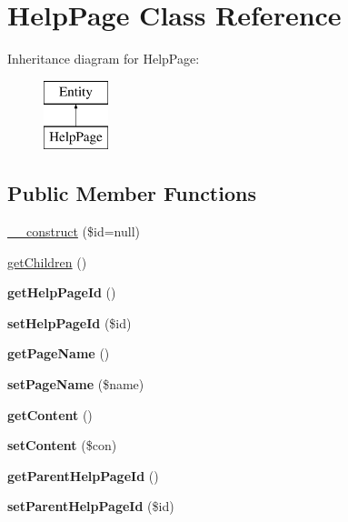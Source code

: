 \hypertarget{classHelpPage}{
\section{HelpPage Class Reference}
\label{classHelpPage}
}
Inheritance diagram for HelpPage:\begin{figure}[H]
\begin{center}
\leavevmode
\includegraphics[height=2.000000cm]{classHelpPage}
\end{center}
\end{figure}
\subsection*{Public Member Functions}
\begin{DoxyCompactItemize}
\item 
\hyperlink{classHelpPage_a46a830bfff2f6eb43d2dfe6475eb47af}{\_\-\_\-construct} (\$id=null)
\item 
\hyperlink{classHelpPage_a8c3a55add9c738d8cda1d7cf197fcb87}{getChildren} ()
\item 
\hypertarget{classHelpPage_a2550e4763c227585f61e019d693ffc68}{
{\bfseries getHelpPageId} ()}
\label{classHelpPage_a2550e4763c227585f61e019d693ffc68}

\item 
\hypertarget{classHelpPage_a4df1fe50e1b81b27d9779917cdc51adc}{
{\bfseries setHelpPageId} (\$id)}
\label{classHelpPage_a4df1fe50e1b81b27d9779917cdc51adc}

\item 
\hypertarget{classHelpPage_a06af91cb569c267cdab83c41bb954b38}{
{\bfseries getPageName} ()}
\label{classHelpPage_a06af91cb569c267cdab83c41bb954b38}

\item 
\hypertarget{classHelpPage_a4db0edd1ad45e3ed7832307cdc331734}{
{\bfseries setPageName} (\$name)}
\label{classHelpPage_a4db0edd1ad45e3ed7832307cdc331734}

\item 
\hypertarget{classHelpPage_a99ca49dc399b4cd85429c3ac4fc249d4}{
{\bfseries getContent} ()}
\label{classHelpPage_a99ca49dc399b4cd85429c3ac4fc249d4}

\item 
\hypertarget{classHelpPage_a156f7f274c93755ffc04372a94d94292}{
{\bfseries setContent} (\$con)}
\label{classHelpPage_a156f7f274c93755ffc04372a94d94292}

\item 
\hypertarget{classHelpPage_aeb7c1692ee2cb9330d51f77b8a86e77d}{
{\bfseries getParentHelpPageId} ()}
\label{classHelpPage_aeb7c1692ee2cb9330d51f77b8a86e77d}

\item 
\hypertarget{classHelpPage_a18b643a638a283710d5eb9bc2cc4f3e7}{
{\bfseries setParentHelpPageId} (\$id)}
\label{classHelpPage_a18b643a638a283710d5eb9bc2cc4f3e7}

\end{DoxyCompactItemize}
